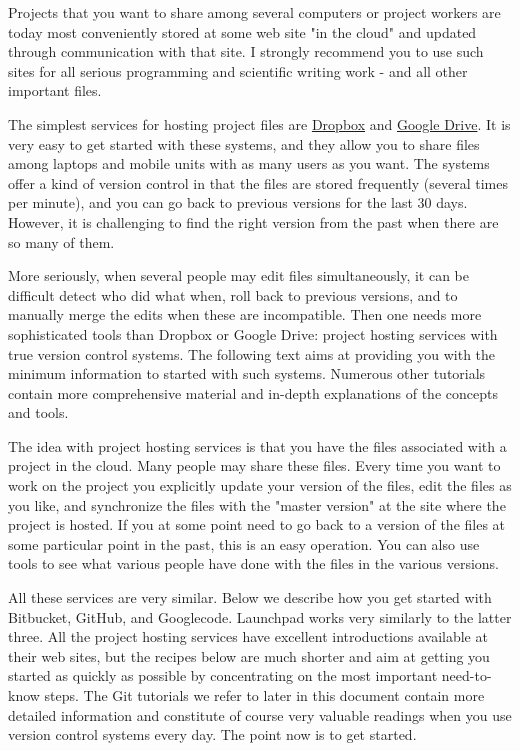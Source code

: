 \documentclass[%
oneside,                 %
final,                   %
10pt]{article}
\theoremstyle{definition}
\begin{document}
\begin{enumerate}
Projects that you want to share among several computers or project
workers are today most conveniently stored at some web site "in the
cloud" and updated through communication with that site. I strongly
recommend you to use such sites for all serious programming and
scientific writing work - and all other important files.

The simplest services for hosting project files are \href{{https://dropbox.com}}{Dropbox} and \href{{https://drive.google.com}}{Google Drive}.
It is very easy to get started with these systems, and they allow you
to share files among laptops and mobile units with as many users as
you want. The systems offer a kind of version control in that the
files are stored frequently (several times per minute), and you can go
back to previous versions for the last 30 days. However, it is
challenging  to find the right version from the past when there are
so many of them.

More seriously, when several people may edit files simultaneously, it
can be difficult detect who did what when, roll back to previous
versions, and to manually merge the edits when these are
incompatible. Then one needs more sophisticated tools than Dropbox or
Google Drive: project hosting services with true version control
systems.  The following text aims at providing you with the minimum
information to started with such systems. Numerous other tutorials
contain more comprehensive material and in-depth explanations of the
concepts and tools.

The idea with project hosting services is that you have the files
associated with a project in the cloud. Many people may share these
files.  Every time you want to work on the project you explicitly
update your version of the files, edit the files as you like, and
synchronize the files with the "master version" at the site where the
project is hosted.  If you at some point need to go back to a
version of the files at some particular point in the past,
this is an easy operation. You can also use tools to see
what various people have done with the files in the various versions.

All these services are very similar. Below we describe how you get
started with Bitbucket, GitHub, and Googlecode. Launchpad works very
similarly to the latter three. All the project hosting services have
excellent introductions available at their web sites, but the recipes
below are much shorter and aim at getting you started as quickly as
possible by concentrating on the most important need-to-know steps.
The Git tutorials we refer to later in this document contain more
detailed information and constitute of course very valuable readings
when you use version control systems every day. The point now is
to get started.


\end{enumerate}
\end{document}
